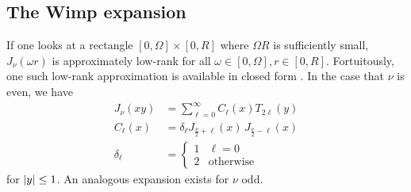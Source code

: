\subsection{The Wimp expansion}\label{sec:local}

If one looks at a rectangle $[0, \Omega] \times [0, R]$ where $\Omega R$ is
sufficiently small, $J_\nu(\omega r)$ is approximately low-rank for all $\omega
\in [0, \Omega], r \in [0, R]$. Fortuitously, one such low-rank approximation is
available in closed form \cite{wimp1962polynomial}. In the case that $\nu$ is
even, we have
\begin{align}
    J_\nu(xy) 
    &= \sum_{\ell=0}^\infty C_\ell(x) T_{2\ell}(y) \\
    C_\ell(x) 
    &= \delta_\ell J_{\frac{\nu}{2} + \ell}(x) \, J_{\frac{\nu}{2} - \ell}(x) \\
    \delta_\ell 
    &= \begin{cases}
        1 & \ell=0 \\
        2 & \text{otherwise}
    \end{cases}
\end{align}
for $\left|y\right| \leq 1$. An analogous expansion exists for $\nu$ odd.

